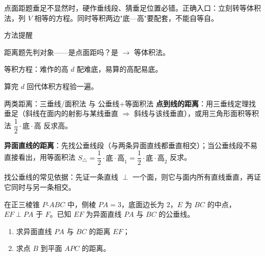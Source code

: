 \documentclass{exam-zh}
\begin{document}
\begin{eduMistakeBox}
点面距题垂足不显然时，硬作垂线段、猜垂足位置必错。正确入口：立刻转等体积法，列 $V$ 相等的方程。同时等积两边"底—高"要配套，不能自等自。\end{eduMistakeBox}




\begin{eduSummaryBlock}{\eduIconPin}{方法提醒}
\begin{eduBulletList}
  \item 距离题先判对象——是点面距吗？是 $\to$ 等体积法。  \item 等积方程：难作的高 $d$ 配难底，易算的高配易底。  \item 算完 $d$ 回代体积方程验一遍。\end{eduBulletList}
\end{eduSummaryBlock}



\clearpage
{}


\begin{eduSolutionBox}{两类距离：三垂线/面积法 与 公垂线+等面积法}
  \begingroup
  \setlength{\parskip}{2.5mm}
\textbf{点到线的距离}：用三垂线定理找垂足（斜线在面内的射影与某线垂直 $\Rightarrow$ 斜线与该线垂直），或用三角形面积等积法 $\dfrac12\cdot 底\cdot 高$ 反求高。\par
\textbf{异面直线的距离}：先找公垂线段（与两条异面直线都垂直相交）；当公垂线段不易直接看出，用等面积法 $S_{\triangle}=\dfrac12\cdot 底\cdot 高_1=\dfrac12\cdot 底\cdot 高_2$ 反求。\par
找公垂线的常见依据：先证一条直线 $\perp$ 一个面，则它与面内所有直线垂直，再证它同时与另一条相交。\par
  \endgroup
\end{eduSolutionBox}




\begin{eduProblemBlock}[例题 2]
在正三棱锥 $P\text{-}ABC$ 中，侧棱 $PA=3$，底面边长为 $2$，$E$ 为 $BC$ 的中点，$EF\perp PA$ 于 $F$。已知 $EF$ 为异面直线 $PA$ 与 $BC$ 的公垂线。
\begin{enumerate}[label=(\arabic*)]
  \item 求异面直线 $PA$ 与 $BC$ 的距离 $EF$；
  \item 求点 $B$ 到平面 $APC$ 的距离。
\end{enumerate}
\end{eduProblemBlock}
\end{document}
